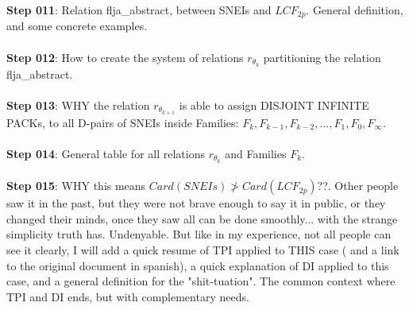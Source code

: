 		\noindent
		\textbf{Step 011}: Relation flja\_abstract, between SNEIs and $LCF_{2p}$. General definition, and some concrete examples.
		\\\\
		
		\noindent
		\textbf{Step 012}: How to create the system of relations $r_{\theta_{k}}$ partitioning the relation flja\_abstract.
		\\\\
		
		\noindent
		\textbf{Step 013}: WHY the relation $r_{\theta_{k+1}}$ is able to assign DISJOINT INFINITE PACKs, to all D-pairs of SNEIs inside Families: $ F_{k}, F_{k-1}, F_{k-2}, ... , F_{1}, F_{0}, F_{\infty} $.
		\\\\
		
		\noindent
		\textbf{Step 014}: General table for all relations $r_{\theta_{k}}$ and Families $F_{k}$.
		\\\\
		
		\noindent
		\textbf{Step 015}: WHY this means $ Card(SNEIs) \ngtr Card(LCF_{2p})$??. Other people saw it in the past, but they were not brave enough to say it in public, or they changed their minds, once they saw all can be done smoothly... with the strange simplicity truth has. Undenyable. But like in my experience, not all people can see it clearly, I will add a quick resume of TPI applied to THIS case ( and a link to the original document in spanish), a quick explanation of DI applied to this case, and a general definition for the "shit-tuation". The common context where TPI and DI ends, but with complementary needs.
		\\\\
		
